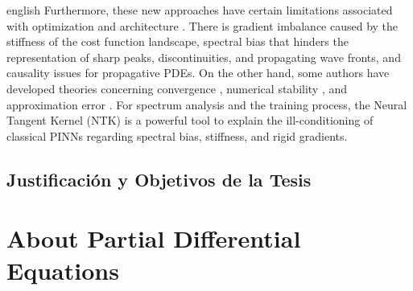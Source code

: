 \documentclass[12pt,letterpaper,twoside]{book}
\newif\ifreviewmode
\newcommand{\revtag}[2]{\ifreviewmode{\color{red!70!black}\textsf{\footnotesize[#1#2]}}\fi}
\newcommand{\verificar}[1]{\revtag{VERIFICAR}{: #1}}
\begin{document}
\begin{hyphenrules}{english}
Furthermore, these new approaches have certain limitations associated with optimization
\cite{wang2021gradient,wang2022ntk,krishnapriyan2021,deshpande2022,nguyen2023} and architecture
\cite{rahaman2019,cao2020spectral,wang2021deeponet}. There is gradient imbalance caused by the
stiffness of the cost function landscape, spectral bias that hinders the representation of sharp peaks,
discontinuities, and propagating wave fronts, and causality issues for propagative PDEs. On the other
hand, some authors have developed theories concerning convergence
\cite{mishra2025,siegel2024,shin2020convergence}, numerical stability
\cite{deryck2024acta,dong2024}, and approximation error \cite{zeinhofer2024,chantada2024}.
For spectrum analysis and the training process, the Neural Tangent Kernel (NTK) is a powerful tool to
explain the ill-conditioning of classical PINNs \cite{jacot2018,wang2022ntk} regarding spectral
bias, stiffness, and rigid gradients.

\section{Justificación y Objetivos de la Tesis}\label{sec:objectives}
\verificar{this section is still empty; objectives are needed to judge pertinence}

\chapter{About Partial Differential Equations}\label{ch:pdes}


\end{hyphenrules}
\end{document}
